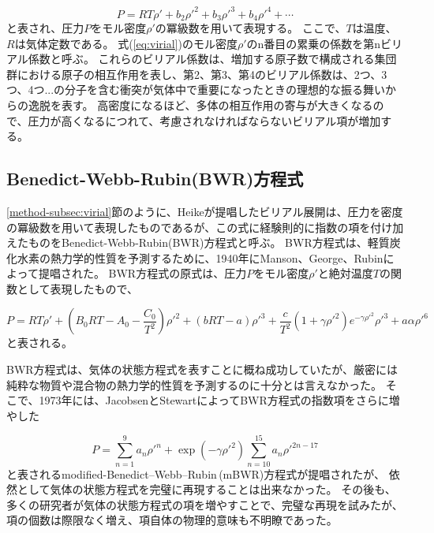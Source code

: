 \documentclass[titlepage]{jsreport}
\begin{document}
{{{\large
\begin{equation}
P=RT{\rho}'+b_2{{\rho}'}^2+b_3{{\rho}'}^3+b_4{{\rho}'}^4+\cdots \label{eq:virial}
\end{equation}
\normalsize
と表され、圧力$P$をモル密度${\rho}'$の冪級数を用いて表現する。
ここで、$T$は温度、$R$は気体定数である。
式(\ref{eq:virial})のモル密度${\rho}'$のn番目の累乗の係数を第nビリアル係数と呼ぶ\cite{virial-expansion}。
これらのビリアル係数は、増加する原子数で構成される集団群における原子の相互作用を表し、第2、第3、第4のビリアル係数は、2つ、3つ、4つ...の分子を含む衝突が気体中で重要になったときの理想的な振る舞いからの逸脱を表す。
高密度になるほど、多体の相互作用の寄与が大きくなるので、圧力が高くなるにつれて、考慮されなければならないビリアル項が増加する\cite{virial-Heike}。

\subsection{Benedict-Webb-Rubin(BWR)方程式}\label{method-subsec:BWR}
\ref{method-subsec:virial}節のように、Heikeが提唱したビリアル展開は、圧力を密度の冪級数を用いて表現したものであるが、この式に経験則的に指数の項を付け加えたものをBenedict-Webb-Rubin(BWR)方程式と呼ぶ。
BWR方程式は、軽質炭化水素の熱力学的性質を予測するために、1940年にManson、George、Rubinによって提唱された\cite{BWR-equation:original}。
BWR方程式の原式は、圧力$P$をモル密度${\rho}'$と絶対温度$T$の関数として表現したもので、

\large
\begin{equation}
P=RT{\rho}'+\left(B_0RT-A_0-{\frac{C_0}{T^2}}\right){{\rho}'}^2+(bRT-a){{\rho}'}^3+{\frac{c}{T^2}}(1+{\gamma}{{\rho}'}^2)e^{-{\gamma}{{\rho}'}^2}{{\rho}'}^3+a{\alpha}{{\rho}'}^6\label{eq:BWR}
\end{equation}
\normalsize
と表される。

BWR方程式は、気体の状態方程式を表すことに概ね成功していたが、厳密には純粋な物質や混合物の熱力学的性質を予測するのに十分とは言えなかった。
そこで、1973年には、JacobsenとStewartによってBWR方程式の指数項をさらに増やした

\large
\begin{equation}
P=\sum_{n=1}^9a_n{{\rho}'}^n+\exp(-{\gamma}{{\rho}'}^2)\sum_{n=10}^{15}a_n{{\rho}'}^{2n-17}\label{eq:mBWR}
\end{equation}
\normalsize
と表されるmodified-Benedict–Webb–Rubin\,(mBWR)方程式が提唱\cite{m-BWR-equation}されたが、
依然として気体の状態方程式を完璧に再現することは出来なかった。
その後も、多くの研究者が気体の状態方程式の項を増やすことで、完璧な再現を試みた\cite{MCCARTY1974276,BWR-equation:13,BWR-equation:25}が、項の個数は際限なく増え、項自体の物理的意味も不明瞭であった。

}}}
\end{document}
